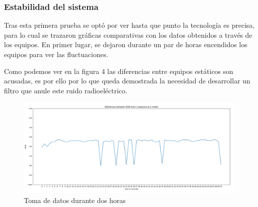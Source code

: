 \documentclass[paper=a4, fontsize=11pt,twoside]{scrartcl}
\begin{document}
        \subsubsection{Estabilidad del sistema}
            Tras esta primera prueba se optó por ver hasta que punto la tecnología es precisa, para lo cual se trazaron gráficas comparativas
            con los datos obtenidos a través de los equipos. En primer lugar, se dejaron durante un par de horas encendidos los equipos para ver las 
            fluctuaciones.

            Como podemos ver en la figura 4 las diferencias entre equipos estáticos son acusadas, es por ello por lo que queda demostrada la necesidad de
            desarrollar un filtro que anule este ruido radioeléctrico.
            \begin{center}
                \begin{figure}[!t]
                    \centering
                    \includegraphics[width=1\textwidth]{../../Memmory/images/5min_beacon_rssi.PNG}
                    \caption{Toma de datos durante dos horas}
                    \label{fig:mesh15}
                \end{figure}
            \end{center}
\end{document}
